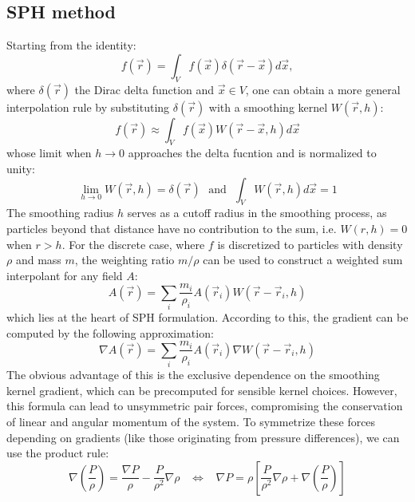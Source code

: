 \documentclass{llncs}
\begin{document}
\subsection{SPH method}
Starting from the identity:
\begin{equation*}
  f(\vec{r}) = \int_Vf(\vec{x}) \delta(\vec{r} - \vec{x}) d\vec{x},
\end{equation*}
where $\delta(\vec{r})$ the Dirac delta function and $\vec{x} \in V$, one can obtain a
more general interpolation rule by substituting $\delta(\vec{r})$ with a smoothing kernel
$W(\vec{r}, h)$:
\begin{equation*}
  \label{eq:c-approx}
  f(\vec{r}) \approx \int_V f(\vec{x}) W(\vec{r}-\vec{x}, h) d\vec{x}
\end{equation*}
whose limit when $h\to0$ approaches the delta fucntion and is normalized to unity:
\begin{equation*}
  \label{eq:kernel-properties}
  \lim_{h\to0}W(\vec{r}, h) = \delta(\vec{r})\ \ \
  \text{and}\ \ \
  \int_VW(\vec{r}, h) d\vec{x} = 1
\end{equation*}
The smoothing radius $h$ serves as a cutoff radius in the smoothing process, as particles
beyond that distance have no contribution to the sum, i.e. $W(r,h) = 0$ when $r>h$. For
the discrete case, where $f$ is discretized to particles with density $\rho$ and mass $m$,
the weighting ratio $m/\rho$ can be used to construct a weighted sum interpolant for any
field $A$:
\begin{equation}
  \label{eq:d-approx}
  A(\vec{r}) = \sum_i \frac{m_i}{\rho_i} A(\vec{r}_i) W(\vec{r}-\vec{r}_i, h)
\end{equation}
which lies at the heart of SPH formulation. According to this, the gradient can be
computed by the following approximation:
\begin{equation}
  \label{eq:d-grad}
  \nabla A(\vec{r}) = \sum_i \frac{m_i}{\rho_i} A(\vec{r}_i) \nabla W(\vec{r} - \vec{r}_i, h)
\end{equation}
The obvious advantage of this is the exclusive dependence on the smoothing kernel
gradient, which can be precomputed for sensible kernel choices. However, this formula can
lead to unsymmetric pair forces, compromising the conservation of linear and angular
momentum of the system. To symmetrize these forces depending on gradients (like those
originating from pressure differences), we can use the product rule:
\begin{equation*}
  \label{eq:grad-identity}
  \nabla \left( \frac{P}{\rho} \right) =
  \frac{\nabla P}{\rho}-
  \frac{P}{\rho^2} \nabla \rho
  \hspace{10pt} \Leftrightarrow \hspace{10pt}
  \nabla P = \rho \left[ \frac{P}{\rho^2} \nabla \rho + \nabla \left( \frac{P}{\rho}
    \right) \right]
\end{equation*}
\end{document}
